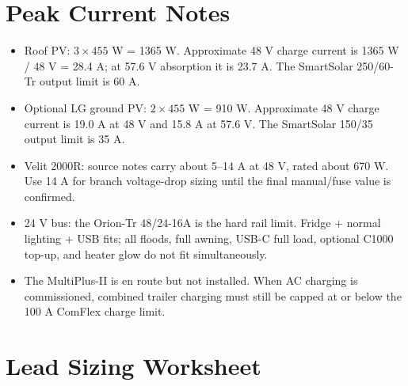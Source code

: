 \documentclass[10pt]{article}
\begin{document}
\section*{Peak Current Notes}

\begin{itemize}
\item Roof PV: \(3 \times 455\) W = 1365 W. Approximate 48 V charge current is 1365 W / 48 V = 28.4 A; at 57.6 V absorption it is 23.7 A. The SmartSolar 250/60-Tr output limit is 60 A.
\item Optional LG ground PV: \(2 \times 455\) W = 910 W. Approximate 48 V charge current is 19.0 A at 48 V and 15.8 A at 57.6 V. The SmartSolar 150/35 output limit is 35 A.
\item Velit 2000R: source notes carry about 5--14 A at 48 V, rated about 670 W. Use 14 A for branch voltage-drop sizing until the final manual/fuse value is confirmed.
\item 24 V bus: the Orion-Tr 48/24-16A is the hard rail limit. Fridge + normal lighting + USB fits; all floods, full awning, USB-C full load, optional C1000 top-up, and heater glow do not fit simultaneously.
\item The MultiPlus-II is en route but not installed. When AC charging is commissioned, combined trailer charging must still be capped at or below the 100 A ComFlex charge limit.
\end{itemize}

\section*{Lead Sizing Worksheet}
\end{document}
